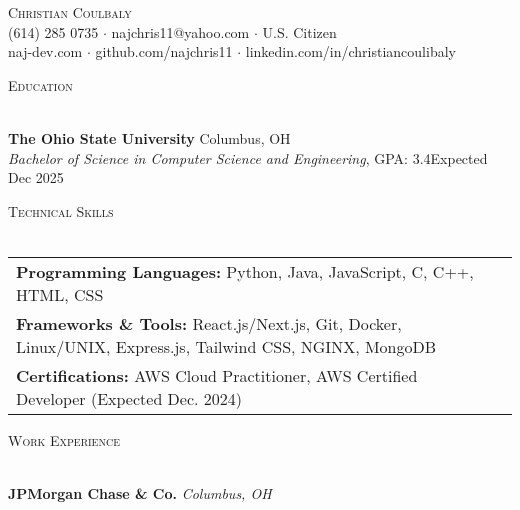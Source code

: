 \documentclass[letterpaper]{article}
\newcommand{\lineunder} {
    \vspace*{-8pt} \\
    \hspace*{-18pt} \hrulefill \\
}
\newcommand{\header} [1] {
    {\hspace*{-18pt}\vspace*{6pt} \textsc{#1}}
    \vspace*{-6pt} \lineunder
}
\begin{document}
\vspace*{-40pt}

\vspace*{-10pt}
\begin{center}
	{\Huge \scshape {Christian Coulbaly}}\\
	(614) 285 0735 $\cdot$ najchris11@yahoo.com $\cdot$ U.S. Citizen \\
    naj-dev.com $\cdot$ github.com/najchris11 $\cdot$ linkedin.com/in/christiancoulibaly\\
\end{center}

\header{Education}
\vspace{1mm}

    \textbf{The Ohio State University} \hfill Columbus, OH\\
    \textit{Bachelor of Science in Computer Science and Engineering}, GPA: 3.4\hfill \hfill Expected Dec 2025\\
    \vspace{2mm}


\header{Technical Skills}
\vspace{1.5mm}
\hspace{-3mm}
\begin{tabular}{ l l }

    \textbf{Programming Languages:} Python, Java, JavaScript, C, C++, HTML, CSS \\

    \textbf{Frameworks \& Tools:} React.js/Next.js, Git, Docker, Linux/UNIX, Express.js, Tailwind CSS, NGINX, MongoDB  \\

    \textbf{Certifications:} AWS Cloud Practitioner, AWS Certified Developer (Expected Dec. 2024)  \\

\end{tabular}
\vspace{2mm}

\header{Work Experience}
\vspace{1mm}

    \textbf{JPMorgan Chase \& Co.} \hfill \textsl{Columbus, OH}\\
    
\end{document}
